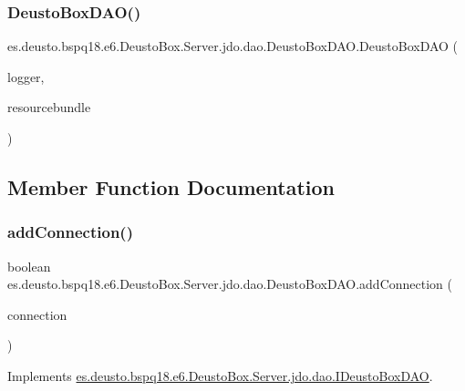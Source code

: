 \subsubsection{\texorpdfstring{Deusto\+Box\+D\+A\+O()}{DeustoBoxDAO()}}
{\footnotesize\ttfamily es.\+deusto.\+bspq18.\+e6.\+Deusto\+Box.\+Server.\+jdo.\+dao.\+Deusto\+Box\+D\+A\+O.\+Deusto\+Box\+D\+AO (\begin{DoxyParamCaption}\item[{\mbox{\hyperlink{classes_1_1deusto_1_1bspq18_1_1e6_1_1_deusto_box_1_1_server_1_1utils_1_1_error__log}{Error\+\_\+log}}}]{logger,  }\item[{Resource\+Bundle}]{resourcebundle }\end{DoxyParamCaption})}



\subsection{Member Function Documentation}
\mbox{\label{classes_1_1deusto_1_1bspq18_1_1e6_1_1_deusto_box_1_1_server_1_1jdo_1_1dao_1_1_deusto_box_d_a_o_a08be11b50fb6622c2b3a961f24c1d940}} 
\subsubsection{\texorpdfstring{add\+Connection()}{addConnection()}}
{\footnotesize\ttfamily boolean es.\+deusto.\+bspq18.\+e6.\+Deusto\+Box.\+Server.\+jdo.\+dao.\+Deusto\+Box\+D\+A\+O.\+add\+Connection (\begin{DoxyParamCaption}\item[{\mbox{\hyperlink{classes_1_1deusto_1_1bspq18_1_1e6_1_1_deusto_box_1_1_server_1_1jdo_1_1data_1_1_d_connection}{D\+Connection}}}]{connection }\end{DoxyParamCaption})}



Implements \mbox{\hyperlink{interfacees_1_1deusto_1_1bspq18_1_1e6_1_1_deusto_box_1_1_server_1_1jdo_1_1dao_1_1_i_deusto_box_d_a_o_aee8406e88334179d4692d118e6ba221d}{es.\+deusto.\+bspq18.\+e6.\+Deusto\+Box.\+Server.\+jdo.\+dao.\+I\+Deusto\+Box\+D\+AO}}.


